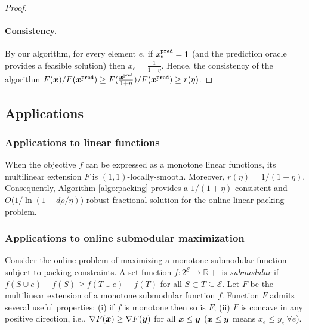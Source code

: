 \begin{proof}
\paragraph{Consistency.} By our algorithm, for every element $e$, if $x^{\texttt{pred}}_{e} = 1$ (and the prediction 
oracle provides a feasible solution) 
then $x_{e} = \frac{1}{1+\eta}$. Hence, the consistency of the algorithm 
$F(\bm{x})/F(\bm{x}^{\texttt{pred}}) \geq F(\frac{\bm{x}^{\texttt{pred}}}{1 + \eta})/F(\bm{x}^{\texttt{pred}}) \geq r(\eta)$.
\end{proof}

%
\subsection{Applications}

\subsubsection{Applications to linear functions}
When the objective $f$ can be expressed as a monotone linear functions, its multilinear extension $F$ 
is $(1,1)$-locally-smooth. Moreover, $r(\eta) = 1/(1+\eta)$. Consequently, 
Algorithm \ref{algo:packing} provides a $1/(1 + \eta)$-consistent
and $O\bigl(1/\ln(1+ d \rho/\eta)\bigr)$-robust fractional solution for the
online linear packing problem.


\subsubsection{Applications to online submodular maximization}	\label{sec:sub-max}
Consider the online problem of maximizing a monotone submodular function subject to packing constraints. 
A set-function $f: 2^{\mathcal{E}} \rightarrow \mathbb{R}+$ is \emph{submodular} if
$f(S \cup e) - f(S) \geq f(T \cup e) - f(T)$ for all $S \subset T \subseteq \mathcal{E}$. 
Let $F$ be the multilinear extension of a monotone submodular function $f$. Function $F$
admits several useful properties: (i) if $f$ is monotone then so is $F$; (ii) $F$ is concave in any
positive direction, i.e., $\nabla F(\bm{x}) \geq \nabla F(\bm{y})$ for all $\bm{x} \leq \bm{y}$
($\bm{x} \leq \bm{y}$ means $x_{e} \leq y_{e} ~\forall e$). 

